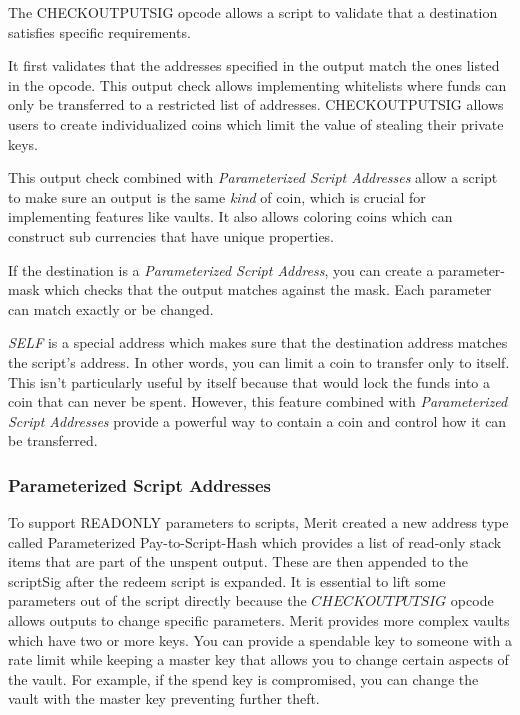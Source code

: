\documentclass{article}
\begin{document}
The CHECKOUTPUTSIG opcode allows a script to validate that a destination satisfies
specific requirements.

It first validates that the addresses specified in the output match the ones
listed in the opcode.  This output check allows implementing whitelists where funds
can only be transferred to a restricted list of addresses.  CHECKOUTPUTSIG allows
users to create individualized coins which limit the value of stealing their private keys.

This output check combined with \emph{Parameterized Script Addresses}
allow a script to make sure an output is the same \emph{kind} of coin, which is crucial
for implementing features like vaults.  It also allows coloring coins which can
construct sub currencies that have unique properties.

If the destination is a \emph{Parameterized Script Address}, you can create a parameter-mask
which checks that the output matches against the mask.  Each parameter can match
exactly or be changed.

\emph{SELF} is a special address which makes sure that the destination address
matches the script's address.  In other words, you can limit a coin to transfer
only to itself.  This isn't particularly useful by itself because that would lock
the funds into a coin that can never be spent.  However, this feature combined
with \emph{Parameterized Script Addresses} provide a powerful way to contain a
coin and control how it can be transferred.

\subsubsection{Parameterized Script Addresses}

To support READONLY parameters to scripts, Merit created a new address type called
Parameterized Pay-to-Script-Hash which provides a list of read-only stack items
that are part of the unspent output.  These are then appended to the scriptSig
after the redeem script is expanded.  It is essential to lift some parameters
out of the script directly because the $CHECKOUTPUTSIG$ opcode allows outputs
to change specific parameters.  Merit provides more complex vaults which have two or
more keys.  You can provide a spendable key to someone with a rate limit while
keeping a master key that allows you to change certain aspects of the vault.
For example, if the spend key is compromised, you can change the vault with
the master key preventing further theft.
\end{document}
